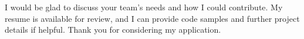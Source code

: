 I would be glad to discuss your team's needs and how I could contribute. My resume is available for review, and I can provide code samples and further project details if helpful. Thank you for considering my application.

